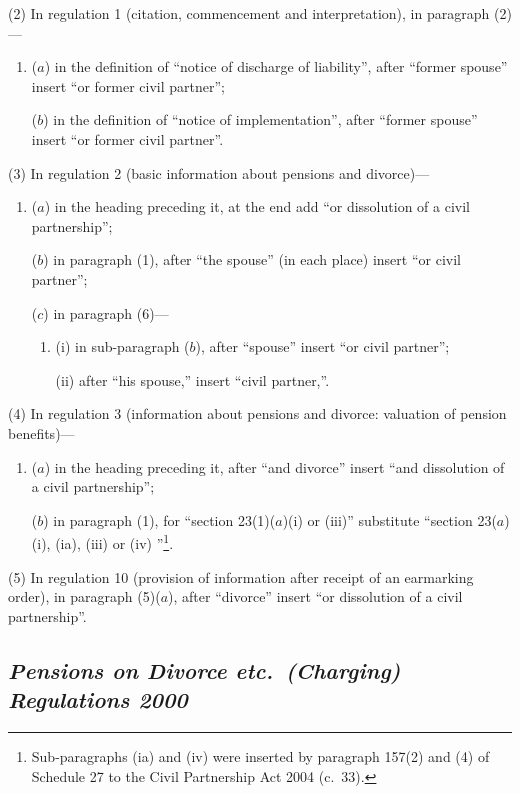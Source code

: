 \documentclass[12pt,a4paper]{article}
\begin{document}
(2) In regulation 1 (citation, commencement and interpretation), in paragraph (2)—
\begin{enumerate}\item[]
($a$) in the definition of “notice of discharge of liability”, after “former spouse” insert “or former civil partner”;

($b$) in the definition of “notice of implementation”, after “former spouse” insert “or former civil partner”.
\end{enumerate}

(3) In regulation 2 (basic information about pensions and divorce)—
\begin{enumerate}\item[]
($a$) in the heading preceding it, at the end add “or dissolution of a civil partnership”;

($b$) in paragraph (1), after “the spouse” (in each place) insert “or civil partner”;

($c$) in paragraph (6)—
\begin{enumerate}\item[]
(i) in sub-paragraph ($b$), after “spouse” insert “or civil partner”;

(ii) after “his spouse,” insert “civil partner,”.
\end{enumerate}
\end{enumerate}

(4) In regulation 3 (information about pensions and divorce: valuation of pension benefits)—
\begin{enumerate}\item[]
($a$) in the heading preceding it, after “and divorce” insert “and dissolution of a civil partnership”;

($b$) in paragraph (1), for “section 23(1)($a$)(i)  or (iii)” substitute “section 23($a$)(i), (ia), (iii)  or (iv) ”\footnote{Sub-paragraphs (ia)  and (iv)  were inserted by paragraph 157(2) and (4) of Schedule 27 to the Civil Partnership Act 2004 (c.\ 33).}.
\end{enumerate}

(5) In regulation 10 (provision of information after receipt of an earmarking order), in paragraph (5)($a$), after “divorce” insert “or dissolution of a civil partnership”.

\subsection*{\itshape Pensions on Divorce etc.\ (Charging) Regulations 2000}
\end{document}
